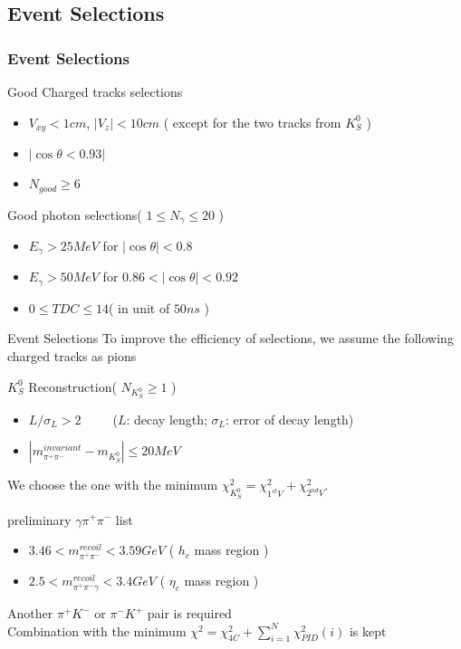 \documentclass{beamer}
\begin{document}
\subsection{Event Selections}
\begin{frame}
    \frametitle{Event Selections}
    \begin{block}{Good Charged tracks selections}
        \begin{itemize}
            \item $V_{xy} < 1 cm$, $ | V_z | < 10 cm$ ( except for the two tracks from $K_S^0$ )
            \item $|\cos\theta < 0.93 |$
            \item $N_{good}\geq 6$
        \end{itemize}
    \end{block}
    \begin{block}{Good photon selections( $1\leq N_{\gamma}\leq 20$ )}
        \begin{itemize}
            \item $E_{\gamma} > 25 MeV$ for $|\cos\theta| < 0.8$
            \item $E_{\gamma} > 50 MeV$ for $0.86<|\cos\theta|<0.92$
            \item $0\leq TDC\leq 14 $( in unit of $50ns$ )
        \end{itemize}
    \end{block}
    \bigskip
\end{frame}

\begin{frame}{Event Selections}
    To improve the efficiency of selections, we assume the following charged tracks as pions
    \begin{block}{$K^0_S$ Reconstruction( $N_{K^0_S} \geq 1$ )}
        \begin{itemize}
            \item $L/\sigma_L > 2 $~~~~~($L$: decay length; $\sigma_L$: error of decay length)
            \item $|m^{invariant}_{\pi^+\pi^-} - m_{K^0_S} | \leq 20 MeV$
        \end{itemize}
        We choose the one with the minimum $\chi^2_{K^0_S} = \chi^2_{1^{st}V}+\chi^2_{2^{nd}V}$.
    \end{block}
    \begin{block}{preliminary $\gamma\pi^+\pi^-$ list}
        \begin{itemize}
            \item $3.46<m_{\pi^+\pi^-}^{recoil}<3.59 GeV$ ( $h_c$ mass region )
            \item $2.5<m_{\pi^+\pi^-\gamma}^{recoil}<3.4 GeV$ ( $\eta_c$ mass region )
        \end{itemize}
    \end{block}
    Another $\pi^+K^-$ or $\pi^-K^+$ pair is required\\
    Combination with the minimum $\chi^2 = \chi^2_{4C} + \sum^N_{i=1}\chi^2_{PID}(i)$ is kept 
\end{frame}
\end{document}
